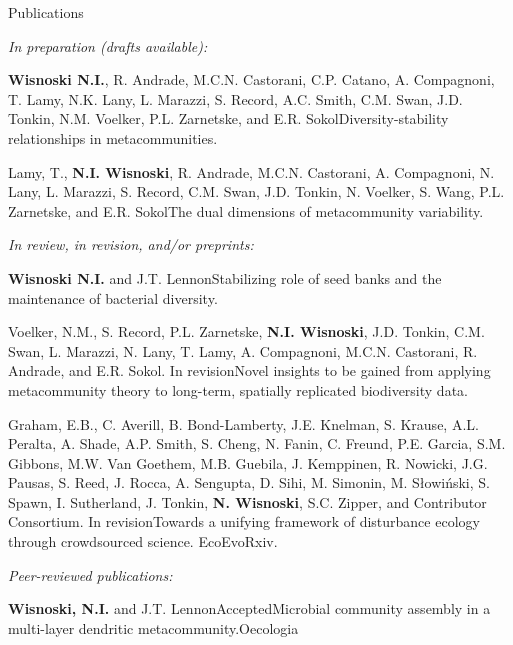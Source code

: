 \documentclass{resume} %
\begin{document}
\begin{rhangSection}{Publications}

{\it In preparation (drafts available):}

\begin{Prep}{{\bf Wisnoski N.I.}, R. Andrade, M.C.N. Castorani, C.P. Catano, A. Compagnoni, T. Lamy, N.K. Lany, L. Marazzi, S. Record, A.C. Smith, C.M. Swan, J.D. Tonkin, N.M. Voelker, P.L. Zarnetske, and E.R. Sokol}{Diversity-stability relationships in metacommunities.}
\end{Prep}

\begin{Prep}{Lamy, T., {\bf N.I. Wisnoski}, R. Andrade, M.C.N. Castorani, A. Compagnoni, N. Lany, L. Marazzi, S. Record, C.M. Swan, J.D. Tonkin, N. Voelker, S. Wang, P.L. Zarnetske, and E.R. Sokol}{The dual dimensions of metacommunity variability.}
\end{Prep}

\bigskip
{\it In review, in revision, and/or preprints:}

\begin{Prep}{{\bf Wisnoski N.I.} and J.T. Lennon}{Stabilizing role of seed banks and the maintenance of bacterial diversity.}
\end{Prep}

\begin{Prep}{Voelker, N.M., S. Record, P.L. Zarnetske, {\bf N.I. Wisnoski}, J.D. Tonkin, C.M. Swan, L. Marazzi, N. Lany, T. Lamy, A. Compagnoni, M.C.N. Castorani, R. Andrade, and E.R. Sokol. In revision}{Novel insights to be gained from applying metacommunity theory to long-term, spatially replicated biodiversity data.}
\end{Prep}

\begin{Prep}{Graham, E.B., C. Averill, B. Bond-Lamberty, J.E. Knelman, S. Krause, A.L. Peralta, A. Shade, A.P. Smith, S. Cheng, N. Fanin, C. Freund, P.E. Garcia, S.M. Gibbons, M.W. Van Goethem, M.B. Guebila, J. Kemppinen, R. Nowicki, J.G. Pausas, S. Reed, J. Rocca, A. Sengupta, D. Sihi, M. Simonin, M. Słowiński, S. Spawn, I. Sutherland, J. Tonkin, {\bf N. Wisnoski}, S.C. Zipper, and Contributor Consortium. In revision}{Towards a unifying framework of disturbance ecology through crowdsourced science. EcoEvoRxiv.}
\end{Prep}

\bigskip


{\it Peer-reviewed publications: }

\begin{Publication}{{\bf Wisnoski, N.I.} and J.T. Lennon}{Accepted}{Microbial community assembly in a multi-layer dendritic metacommunity.}{Oecologia}
\end{Publication}


\end{rhangSection}
\end{document}
